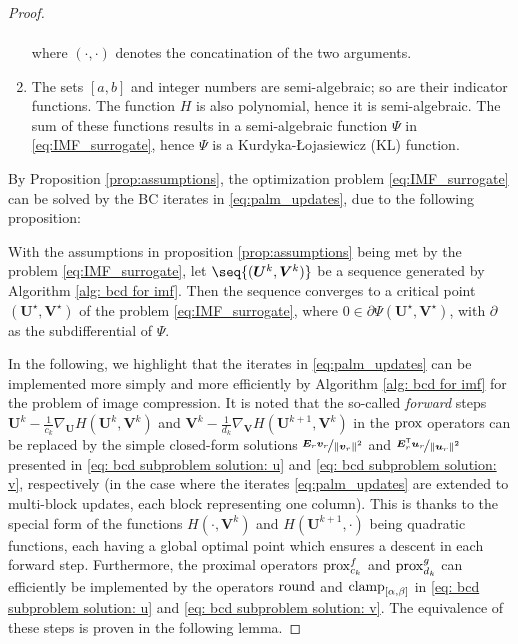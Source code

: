 \begin{proof}
\begin{prop}
\begin{enumerate}
\begin{align}
            \end{align}
            where $(\cdot,\cdot)$ denotes the concatination of the two arguments.
            \item The sets $[a,b]$ and integer numbers are semi-algebraic; so are their indicator functions. The function $H$ is also polynomial, hence it is semi-algebraic. The sum of these functions results in a semi-algebraic function $\Psi$ in \eqref{eq:IMF_surrogate}, hence $\Psi$ is a Kurdyka-Łojasiewicz (KL) function.
        \end{enumerate}
    \end{prop}
    By Proposition \ref{prop:assumptions}, the optimization problem \eqref{eq:IMF_surrogate} can be solved by the BC iterates in \eqref{eq:palm_updates}, due to the following proposition:
    \begin{prop}\label{prop:convergence}
        With the assumptions in proposition \ref{prop:assumptions} being met by the problem \eqref{eq:IMF_surrogate}, let $\seq{(\bm U^k, \bm V^k)}$ be a sequence generated by Algorithm \ref{alg: bcd for imf}. Then the sequence converges to a critical point $(\bm U^\star, \bm V^\star)$ of the problem \eqref{eq:IMF_surrogate}, where $0 \in \partial \Psi(\bm U^\star, \bm V^\star)$, with $\partial$ as the subdifferential of $\Psi$.
    \end{prop}

    In the following, we highlight that the iterates in \eqref{eq:palm_updates} can be implemented more simply and more efficiently by Algorithm \ref{alg: bcd for imf} for the problem of image compression. It is noted that the so-called \emph{forward} steps $\bm U^k - \frac{1}{c_k} \nabla_{\bm U} H(\bm U^k, \bm V^k)$ and $\bm V^k - \frac{1}{d_k} \nabla_{\bm V} H(\bm U^{k+1}, \bm V^k)$ in the $\operatorname{prox}$ operators can be replaced by the simple closed-form solutions $\nicefrac{\bm{E}_r \bm{v}_r}{\lVert \bm{v}_r \rVert^2}$ and $\nicefrac{\bm{E}_r^\mathsf{T} \bm{u}_r}{\lVert \bm{u}_r \rVert^2}$ presented in \eqref{eq: bcd subproblem solution: u} and \eqref{eq: bcd subproblem solution: v}, respectively (in the case where the iterates \eqref{eq:palm_updates} are extended to multi-block updates, each block representing one column). This is thanks to the special form of the functions $H(\cdot, \bm V^k)$ and $H(\bm U^{k+1}, \cdot)$ being quadratic functions, each having a global optimal point which ensures a descent in each forward step. 
    Furthermore, the proximal operators $\operatorname{prox}^f_{c_k}$ and $\operatorname{prox}^g_{d_k}$ can efficiently be implemented by the operators $\operatorname{round}$ and $\operatorname{clamp}_{[\alpha,\beta]}$ in \eqref{eq: bcd subproblem solution: u} and \eqref{eq: bcd subproblem solution: v}. The equivalence of these steps is proven in the following lemma.


\end{proof}
